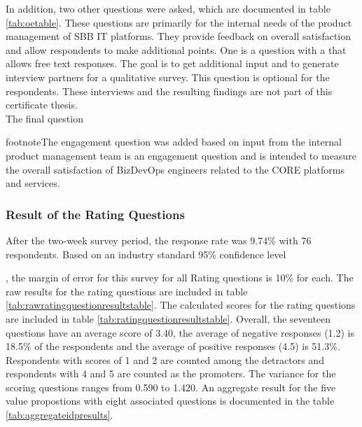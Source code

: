 \documentclass[a4paper,12pt]{article}
\begin{document}
    In addition, two other questions were asked, which are documented in table \ref{tab:oetable}.
    These questions are primarily for the internal needs of the product management of SBB IT platforms.
    They provide feedback on overall satisfaction and allow respondents to make additional points.
    One is a question with a that allows free text responses.
    The goal is to get additional input and to generate interview partners for a qualitative survey.
    This question is optional for the respondents.
    These interviews and the resulting findings are not part of this certificate thesis.\\
    The final question {footnote{The engagement question was added based on input from the internal product management team}
    is an engagement question and is intended to measure the overall satisfaction of BizDevOps engineers related to the CORE platforms and services.

    \subsubsection{Result of the Rating Questions}
    \label{sssec:rratque}
    After the two-week survey period, the response rate was 9.74\% with 76 respondents.
    Based on an industry standard 95\% confidence level\parencite{nistmean}}, the margin of error for this survey for all
    Rating questions is 10\% for each.
    The raw results for the rating questions are included in table \ref{tab:rawratingquestionresultstable}.
    The calculated scores for the rating questions are included in table \ref{tab:ratingquestionresultstable}.
    Overall, the seventeen questions have an average score of 3.40, the average of negative responses (1.2) is 18.5\% of the
    respondents and the average of positive responses (4.5) is 51.3\%.
    Respondents with scores of 1 and 2 are counted among the detractors and respondents with 4 and 5 are counted as the promoters.
    The variance for the scoring questions ranges from 0.590 to 1.420.
    An aggregate result for the five value propostions with eight associated questions is documented in the table \ref{tab:aggregateidpresults}.
\end{document}
